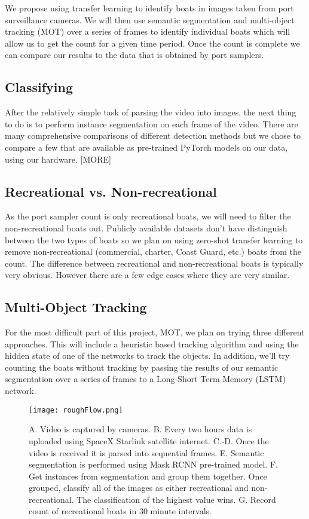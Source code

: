 \documentclass[10pt,twocolumn,letterpaper]{article}
\begin{document}
We propose using transfer learning to identify boats in images taken from port surveillance cameras. We will then use semantic segmentation and multi-object tracking (MOT) over a series of frames to identify individual boats which will allow us to get the count for a given time period. Once the count is complete we can compare our results to the data that is obtained by port samplers.

\subsection{Classifying}

After the relatively simple task of parsing the video into images, the next thing to do is to perform instance segmentation on each frame of the video. There are many comprehensive comparisons of different detection methods \cite{pytorch_models} but we chose to compare a few that are available as pre-trained PyTorch models on our data, using our hardware. [MORE]

\subsection{Recreational vs. Non-recreational}

 As the port sampler count is only recreational boats, we will need to filter the non-recreational boats out. Publicly available datasets don't have distinguish between the two types of boats so we plan on using zero-shot transfer learning to remove non-recreational (commercial, charter, Coast Guard, etc.) boats from the count. The difference between recreational and non-recreational boats is typically very obvious. However there are a few edge cases where they are very similar.

\subsection{Multi-Object Tracking}

For the most difficult part of this project, MOT, we plan on trying three different approaches. This will include a heuristic based tracking algorithm and using the hidden state of one of the networks to track the objects. In addition, we'll try counting the boats without tracking by passing the results of our semantic segmentation over a series of frames to a Long-Short Term Memory (LSTM) network.

\begin{figure*}[t]
  \centering
    \texttt{[image: roughFlow.png]}
    \caption{A. Video is captured by cameras. B. Every two hours data is uploaded using SpaceX Starlink satellite internet. C.-D. Once the video is received it is parsed into sequential frames. E. Semantic segmentation is performed using Mask RCNN pre-trained model. F. Get instances from segmentation and group them together. Once grouped, classify all of the images as either recreational and non-recreational. The classification of the highest value wins. G. Record count of recreational boats in 30 minute intervals.}
    \label{fig:pipline}
  \hfill
\end{figure*}
\end{document}
